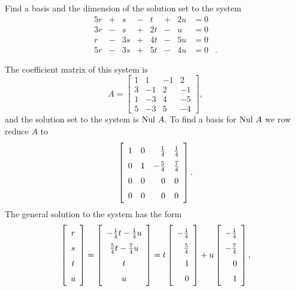 \begin{example} Find a basis and the dimension of the solution set to the system
\begin{alignat*}{5}
{}r	&{}+{} 	&{}s 		&{}-{}	&{}t	&{}+{}	&{2}u &= 0&{} \\
{3}r	&{}-{} 	&{}s 		&{}+{}	&{2}t	&{}-{}	&{}u &= 0&{} \\
{}r	&{}-{} 	&{3}s 	&{}+{}	&{4}t	&{}-{}	&{5}u &= 0&{} \\
{5}r	&{}-{} 	&{3}s 	&{}+{}	&{5}t	&{}-{}	&{4}u &= 0&{.}
\end{alignat*}

\ExampleSolution

The coefficient matrix of this system is 
\[A = \left[ \begin{array}{crrr} 1&1&-1&2\\3&-1&2&-1\\1&-3&4&-5\\5&-3&5&-4 \end{array} \right],\]
and the solution set to the system is $\text{Nul } A$. To find a basis for $\text{Nul } A$ we row reduce $A$ to 
\[\left[ \renewcommand{\arraystretch}{1.5} \begin{array}{ccrc} 1&0&\frac{1}{4}&\frac{1}{4} \\0&1&-\frac{5}{4}&\frac{7}{4} \\ 0&0&0&0 \\ 0&0&0&0 \end{array} \right].\]
The general solution to the system has the form
\[\left[ \begin{array}{c}r\\s\\t\\u \end{array} \right] = \left[ \renewcommand{\arraystretch}{1.5}  \begin{array}{c}-\frac{1}{4}t-\frac{1}{4}u\\\frac{5}{4}t-\frac{7}{4}u\\t\\u \end{array} \right] =  t\left[ \renewcommand{\arraystretch}{1.5}  \begin{array}{r}-\frac{1}{4}\\\frac{5}{4}\\1\\0\end{array} \right] + u \left[ \renewcommand{\arraystretch}{1.5}  \begin{array}{r}-\frac{1}{4}\\-\frac{7}{4}\\0\\1 \end{array} \right],\]

\end{example}
